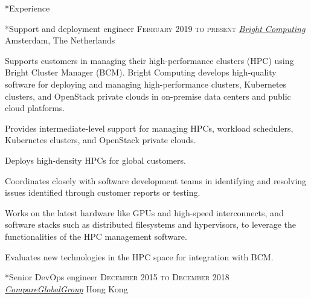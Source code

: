 \documentclass[10pt, a4paper, final]{article}
\begin{document}
\vspace{1em}

\begin{section}*{Experience}
  \begin{subsection}*{Support and deployment engineer \hfill\textsc{February 2019 to present}}
    \href{https://www.brightcomputing.com/}{\textit{Bright Computing}} \hfill Amsterdam, The Netherlands
    \vspace{1em}

    Supports customers in managing their high-performance clusters (HPC) using Bright Cluster Manager (BCM). Bright Computing develops high-quality software for deploying and managing high-performance clusters, Kubernetes clusters, and OpenStack private clouds in on-premise data centers and public cloud platforms.
    \vspace{1em}
    \begin{compactitem}
      \item Provides intermediate-level support for managing HPCs, workload schedulers, Kubernetes clusters, and OpenStack private clouds.
      \item Deploys high-density HPCs for global customers.
      \item Coordinates closely with software development teams in identifying and resolving issues identified through customer reports or testing.
      \item Works on the latest hardware like GPUs and high-speed interconnects, and software stacks such as distributed filesystems and hypervisors, to leverage the functionalities of the HPC management software.
      \item Evaluates new technologies in the HPC space for integration with BCM.
      
    \end{compactitem}
  \end{subsection}
  \vspace{2.5em}

  \begin{subsection}*{Senior DevOps engineer \hfill\textsc{December 2015 to December 2018}}
    \href{http://www.compareglobalgroup.com}{\textit{CompareGlobalGroup}} \hfill Hong Kong
    \vspace{1em}


\end{subsection}
\end{section}
\end{document}
